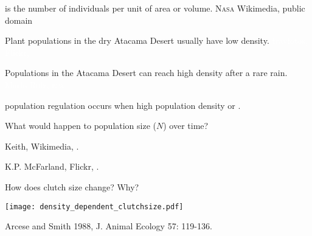 \documentclass[t]{beamer}
\begin{document}
%
{
\begin{frame}[b]{ is the number of individuals per unit of area or volume.}
	\hfill \tiny N\textsc{asa} Wikimedia, public domain
\end{frame}
}
%
{
	\begin{frame}[b]{Plant populations in the dry Atacama Desert usually have low density.}
		\hfill \tiny \textcolor{white}{travfotos, Flickr, }
	\end{frame}
}
%
{
	\begin{frame}[b]{Populations in the Atacama Desert can reach high density after a rare rain.}
		\hfill \tiny \textcolor{white}{Mario Ruiz, \textsc{epa}}
	\end{frame}
}
%
%
%
\begin{frame}{}

	\hangpara {} population regulation occurs when high population density  or .
	
	\hangpara What would happen to population size ($N$) over time?
	
\end{frame}
%
{
\begin{frame}[b]{}
\tiny\textcolor{gray!20!white}{Keith, Wikimedia, .}
\end{frame}
}
%
{
\begin{frame}[b]{}
\tiny\textcolor{gray!20!white}{K.P. McFarland, Flickr, .}
\end{frame}
}
%
\begin{frame}[b]{How does clutch size change? Why?}
	\begin{center}
		\texttt{[image: density\_dependent\_clutchsize.pdf]}
	\end{center}	

	\tiny Arcese and Smith 1988, J. Animal Ecology 57: 119-136.
\end{frame}
\end{document}
